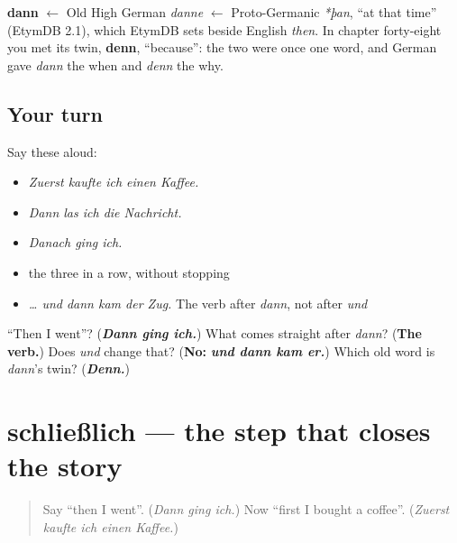 \begin{cousinweb}
\textbf{dann} $\leftarrow$ Old High German \emph{danne} $\leftarrow$ Proto-Germanic \emph{*þan}, \textquotedblleft{}at that time\textquotedblright{} (EtymDB 2.1), which EtymDB sets beside English \emph{then}. In chapter forty-eight you met its twin, \textbf{denn}, \textquotedblleft{}because\textquotedblright{}: the two were once one word, and German gave \emph{dann} the when and \emph{denn} the why.
\end{cousinweb}

\subsection*{Your turn}
Say these aloud:

\begin{itemize}
\raggedright
  \item \emph{Zuerst kaufte ich einen Kaffee.}
  \item \emph{Dann las ich die Nachricht.}
  \item \emph{Danach ging ich.}
  \item the three in a row, without stopping
  \item \emph{… und dann kam der Zug.} The verb after \emph{dann}, not after \emph{und}
\end{itemize}

\begin{tcolorbox}[breakable,colback=teal!4,colframe=teal!35!black,title={Before you move on}]
\textquotedblleft{}Then I went\textquotedblright{}? (\emph{\textbf{Dann ging ich.}}) What comes straight after \emph{dann}? (\textbf{The verb.}) Does \emph{und} change that? (\textbf{No:} \emph{\textbf{und dann kam er.}}) Which old word is \emph{dann}'s twin? (\emph{\textbf{Denn.}})
\end{tcolorbox}
\section[schließlich]{schließlich — the step that closes the story}

\label{lesson:GE-C253-schliesslich}



\begin{quote}
Say \textquotedblleft{}then I went\textquotedblright{}. (\emph{Dann ging ich.}) Now \textquotedblleft{}first I bought a coffee\textquotedblright{}. (\emph{Zuerst kaufte ich einen Kaffee.})
\end{quote}

